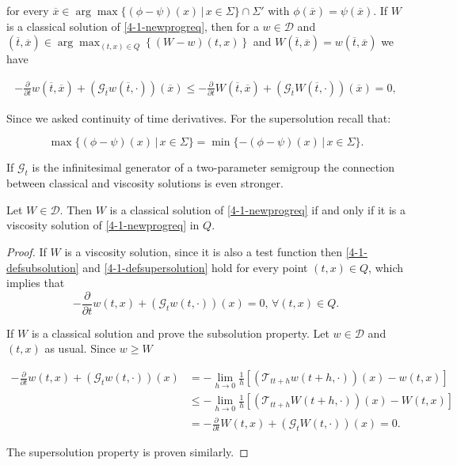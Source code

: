 for every $\overline{x}\in\arg \max \{(\phi-\psi)(x)\,|\,x\in\Sigma\}\cap\Sigma'$ with $\phi(\overline{x})=\psi(\overline{x})$. If $W$ is a classical solution of \ref{4-1-newprogreq}, then for a $w\in\mathcal{D}$ and $\left(\overline{t},\overline{x}\right) \in \arg \max_{(t,x)\in Q}\left\{(W-w)(t,x)\right\}$ 
and $W\left(\overline{t},\overline{x}\right)=w\left(\overline{t},\overline{x}\right)$ we have

\begin{align*}
    -\frac{\partial}{\partial t}w\left(\overline{t},\overline{x}\right) + \left(\mathcal{G}_{\overline{t}}w\left(\overline{t},\cdot\right)\right)\left(\overline{x}\right) \leq -\frac{\partial}{\partial t}W\left(\overline{t},\overline{x}\right) + \left(\mathcal{G}_{\overline{t}}W\left(\overline{t},\cdot\right)\right)\left(\overline{x}\right) = 0,
\end{align*}

Since we asked continuity of time derivatives. For the supersolution recall that:

\[ \max \{(\phi-\psi)(x)\,|\,x\in \Sigma\} = \min \{-(\phi-\psi)(x)\,|\,x\in \Sigma\}.\]

If $\mathcal{G}_t$ is the infinitesimal generator of a two-parameter semigroup the connection between classical and viscosity solutions is even stronger.

\begin{proposition}
    Let $W\in\mathcal{D}$. Then $W$ is a classical solution of \ref{4-1-newprogreq} if and only if it is a viscosity solution of \ref{4-1-newprogreq} in $Q$.

    \begin{proof}
        If $W$ is a viscosity solution, since it is also a test function then \ref{4-1-defsubsolution} and \ref{4-1-defsupersolution} hold for every point $(t,x)\in Q$, 
        which implies that
        \[-\frac{\partial}{\partial t}w(t,x) + \left(\mathcal{G}_tw(t,\cdot)\right)(x) = 0,\,\forall(t,x)\in Q.\] 

        If $W$ is a classical solution and prove the subsolution property. Let $w\in\mathcal{D}$ and $(t,x)$ as usual. Since $w\geq W$

        \begin{align*}
            -\frac{\partial}{\partial t}w(t,x) + (\mathcal{G}_tw(t,\cdot))(x) & = - \lim_{h\to0} \frac{1}{h}\left[(\mathcal{T}_{tt+h}w(t+h,\cdot))(x)-w(t,x)\right] \\
            & \leq - \lim_{h\to0} \frac{1}{h}\left[(\mathcal{T}_{tt+h}W(t+h,\cdot))(x)-W(t,x)\right] \\
            & = -\frac{\partial}{\partial t}W(t,x) + (\mathcal{G}_tW(t,\cdot))(x) = 0.
        \end{align*}

        The supersolution property is proven similarly.
    \end{proof}
\end{proposition}

